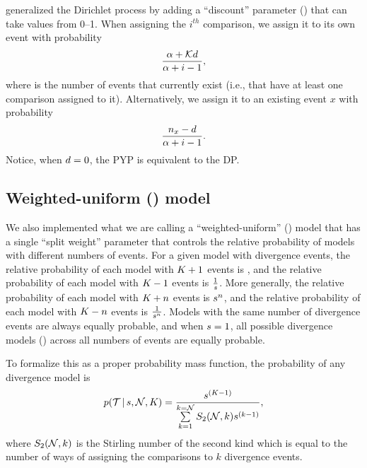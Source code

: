 \documentclass[letterpaper,12pt]{article}
\begin{document}
\begin{linenomath}
\citet{PitmanYor1997} generalized the Dirichlet process by adding a
``discount'' parameter (\discount) that can take values from 0--1.
When assigning the $i^{th}$ comparison, we assign it to its own event
with probability
\begin{equation}
    \frac{\alpha + \mathcal{K} d}{\alpha + i - 1},
    \label{eq:pypnewcat}
\end{equation}
where \nexistingcats is the number of events that currently exist (i.e., that have at
least one comparison assigned to it).
Alternatively, we assign it to an existing event $x$ with probability
\begin{equation}
    \frac{n_x - d}{\alpha + i -1}.
    \label{eq:pypexistingcat}
\end{equation}
Notice, when $d = 0$, the PYP is equivalent to the DP.
\end{linenomath}

\subsection{Weighted-uniform (\wunif) model}
We also implemented what we are calling a ``weighted-uniform'' (\wunif) model
that has a single ``split weight'' parameter that controls the relative
probability of models with different numbers of events.
For a given model with \nevents divergence events, the relative probability
of each model with $K_{} + 1$ events is \splitweight,
and the relative probability of each model with $K_{} - 1$ events is
$\frac{1}{s}$.
More generally, the relative probability of each model with
$K_{} + n$
events is
$s{}^n$,
and the relative probability of each model with
$K_{} - n$
events is
$\frac{1}{s{}^n}$.
Models with the same number of divergence events
are always equally probable,
and
when $s = 1$, all possible divergence models (\etimesets) across all
numbers of events are equally probable.

\begin{linenomath}
To formalize this as a proper probability mass function,
the probability of any divergence model is
\begin{equation}
    p(\mathcal{T} \,|\, s, \mathcal{N}, K_{}) = 
    \frac{
        s^{(K_{} - 1)}
    }{
        \sum\limits_{k=1}^{k=\mathcal{N}} S_2(\mathcal{N}, k) s^{(k-1)}
    },
    \label{eq:uniformdivmodelprob}
\end{equation}
where $S_2(\mathcal{N}, k)$ is the Stirling number of the second kind which
is equal to the number of ways of assigning the \ncomparisons comparisons to
$k$ divergence events.
\end{linenomath}
\end{document}
